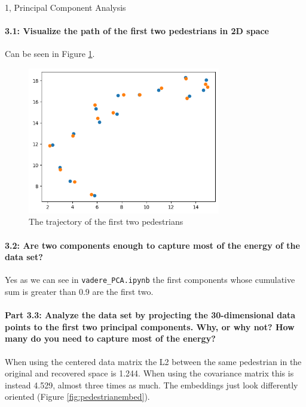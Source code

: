 \begin{task}{1, Principal Component Analysis}
\paragraph{3.1: Visualize the path of the first two pedestrians in 2D space}

Can be seen in Figure \ref{fig:first2pedestriantraj}.

\begin{figure}[H]
    \centering
    \includegraphics[width=0.75\textwidth]{images/first2pedestriantraj.png}
    \caption{The trajectory of the first two pedestrians}
    \label{fig:first2pedestriantraj}
\end{figure}

\paragraph{3.2: Are two components enough to capture most of the energy of the data set?}

Yes as we can see in \verb+vadere_PCA.ipynb+ the first components whose cumulative sum is greater than 0.9 are the first two.

\paragraph{Part 3.3: Analyze the data set by projecting the 30-dimensional data points to the first
two principal components. Why, or why not? How many do you need to capture most of the energy?}

When using the centered data matrix the L2 between the same pedestrian in the original and recovered space is 1.244. When using the covariance matrix this is instead 4.529, almost three times as much. The embeddings just look differently oriented (Figure \ref{fig:pedestrianembed}).


\end{task}
